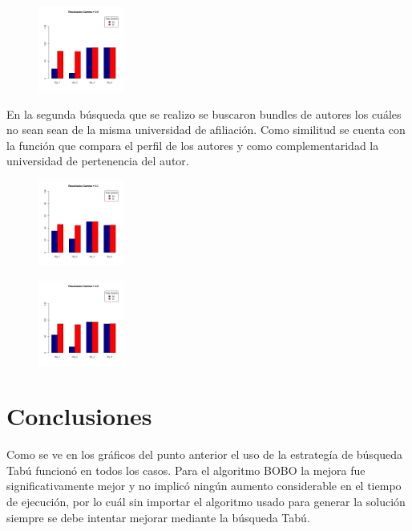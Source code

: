 \begin{figure}[H]
	\centering
	\includegraphics[width=0.25\textwidth]{img/gamma09.png}
	\caption{}
	\label{res:img-gamma09-papers}
\end{figure}
En la segunda búsqueda que se realizo se buscaron bundles de autores los cuáles no sean sean de la misma universidad de afiliación. Como similitud se cuenta con la función que compara el perfil de los autores y como complementaridad la universidad de pertenencia del autor.
\begin{figure}[H]
	\centering
	\includegraphics[width=0.25\textwidth]{img/gamma01-autores.png}
	\caption{}
	\label{res:img-gamma01-authors}
\end{figure}

\begin{figure}[H]
	\centering
	\includegraphics[width=0.25\textwidth]{img/gamma09-autores.png}
	\caption{}
	\label{res:img-gamma09-authors}
\end{figure}
\section{Conclusiones}
Como se ve en los gráficos del punto anterior el uso de la estrategía de búsqueda Tabú funcionó en todos los casos. Para el algoritmo BOBO la mejora fue significativamente mejor y no implicó ningún aumento considerable en el tiempo de ejecución, por lo cuál sin importar el algoritmo usado para generar la solución siempre se debe intentar mejorar mediante la búsqueda Tabú.
